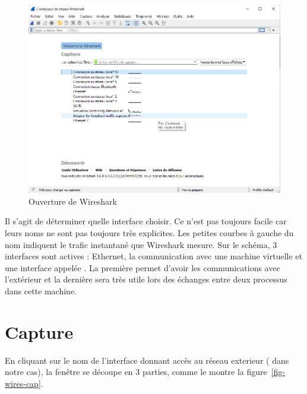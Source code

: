\begin{figure}[tbp]
\centerline{\includegraphics[width=1\columnwidth]{Pictures/wireshark-open.png}}
\caption{Ouverture de Wireshark}
\label{fig-wires-open}
\end{figure}


Il s'agit de déterminer quelle interface choisir. Ce n'est pas toujours facile car leurs noms ne sont pas toujours très explicites. Les petites courbes à gauche du nom indiquent le trafic instantané que Wireshark mesure. Sur le schéma, 3 interfaces sont actives : Ethernet, la communication avec une machine virtuelle et une interface appelée \textit{}.  La première permet d'avoir les communications avec l'extérieur et la dernière sera très utile lors des échanges entre deux processus dans cette machine.

\section {Capture}

En cliquant sur le nom de l'interface donnant accès au réseau exterieur ( dans notre cas), la fenêtre se découpe en 3 parties, comme le montre la figure~\vref{fig-wires-cap}.


